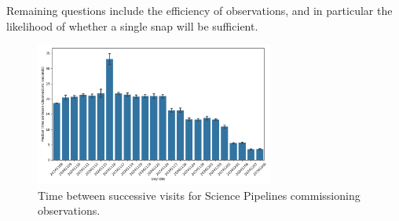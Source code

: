 Remaining questions include the efficiency of observations, and in particular the likelihood of whether a single snap will be sufficient.

\begin{figure}
    \centering
    \includegraphics[width=0.7\textwidth]{sp/timeBetweenExposures20241208.png}
    \caption{Time between successive visits for Science Pipelines commissioning observations.}
    \label{fig:time_between_visits}
\end{figure}
